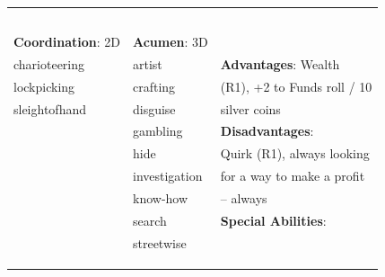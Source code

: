 \documentclass[10pt]{article}
\begin{document}
\begin{table}
\begin{tabular}{m{156pt} m{156pt} m{156pt}}
 \hrulefill &  \hrulefill & \\

 \hrulefill &  \hrulefill & \\

 \hrulefill &  \hrulefill & \\

 \hrulefill &  \hrulefill & \\

 \hrulefill &  \hrulefill & \\


\textbf{Coordination}: 2D \hrulefill & \textbf{Acumen}: 3D \hrulefill     & \hrulefill \\

charioteering        \hrulefill & artist               \hrulefill & \textbf{Advantages}: Wealth \hrulefill \\

lockpicking          \hrulefill & crafting             \hrulefill & (R1),  +2 to Funds roll / 10 \hrulefill \\

sleightofhand        \hrulefill & disguise             \hrulefill & silver coins \hrulefill \\

 \hrulefill & gambling             \hrulefill & \textbf{Disadvantages}: \hrulefill \\

 \hrulefill & hide                 \hrulefill & Quirk (R1), always looking \hrulefill \\

 \hrulefill & investigation        \hrulefill & for a way to make a profit \hrulefill \\

 \hrulefill & know-how             \hrulefill & -- always \hrulefill \\

 \hrulefill & search               \hrulefill & \textbf{Special Abilities}: \hrulefill \\

 \hrulefill & streetwise           \hrulefill &  \hrulefill \\

 \hrulefill &  \hrulefill &  \hrulefill \\

 \hrulefill &  \hrulefill &  \hrulefill \\

 \hrulefill &  \hrulefill &  \hrulefill \\


\end{tabular}
\end{table}
\end{document}
